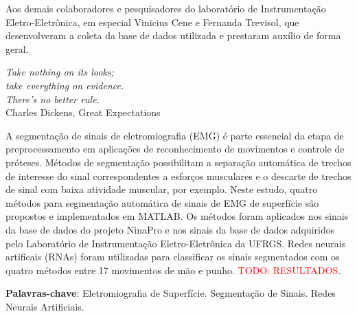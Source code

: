 
\begin{agradecimentos}
	Aos demais colaboradores e pesquisadores do laboratório de Instrumentação Eletro-Eletrônica, em especial Vinicius Cene e Fernanda Trevisol, que desenvolveram a coleta da base de dados utilizada e prestaram auxílio de forma geral.
\end{agradecimentos}


\begin{epigrafe}
    \vspace*{\fill}
	\begin{flushright}
		\textit{Take nothing on its looks;\\ take everything on evidence.\\ There's no better rule.}\\ \vspace{\onelineskip}
		Charles Dickens, Great Expectations
	\end{flushright}
\end{epigrafe}


\setlength{\absparsep}{18pt} %
\begin{resumo}

	A segmentação de sinais de eletromiografia (EMG) é parte essencial da etapa de preprocessamento em aplicações de reconhecimento de movimentos e controle de próteses. Métodos de segmentação possibilitam a separação automática de trechos de interesse do sinal correspondentes a esforços musculares e o descarte de trechos de sinal com baixa atividade muscular, por exemplo. Neste estudo, quatro métodos para segmentação automática de sinais de EMG de superfície são propostos e implementados em MATLAB. Os métodos foram aplicados nos sinais da base de dados do projeto NinaPro e nos sinais da base de dados adquiridos pelo Laboratório de Instrumentação Eletro-Eletrônica da UFRGS. Redes neurais artificais (RNAs) foram utilizadas para classificar os sinais segmentados com os quatro métodos entre 17 movimentos de mão e punho. \textcolor{red}{TODO: RESULTADOS}.

	\vspace{\onelineskip}
	\textbf{Palavras-chave}: Eletromiografia de Superfície. Segmentação de Sinais. Redes Neurais Artificiais.
\end{resumo}


